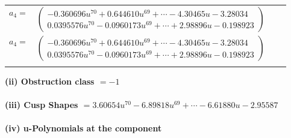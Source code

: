 \documentclass[1p]{elsarticle_modified}
\theoremstyle{definition}
\begin{document}
\begin{tabular}{m{7pt} m{180pt} m{7pt} m{180pt} }
\flushright $a_{4}=$&$\begin{pmatrix}-0.360696 u^{70}+0.644610 u^{69}+\cdots-4.30465 u-3.28034\\0.0395576 u^{70}-0.0960173 u^{69}+\cdots+2.98896 u-0.198923\end{pmatrix}$\\ \flushright $a_{4}=$&$\begin{pmatrix}-0.360696 u^{70}+0.644610 u^{69}+\cdots-4.30465 u-3.28034\\0.0395576 u^{70}-0.0960173 u^{69}+\cdots+2.98896 u-0.198923\end{pmatrix}$\\&\end{tabular}
\flushleft \textbf{(ii) Obstruction class $= -1$}\\~\\
\flushleft \textbf{(iii) Cusp Shapes $= 3.60654 u^{70}-6.89818 u^{69}+\cdots-6.61880 u-2.95587$}\\~\\
\newpage\renewcommand{\arraystretch}{1}
\flushleft \textbf{(iv) u-Polynomials at the component}\newline \\
\end{document}
